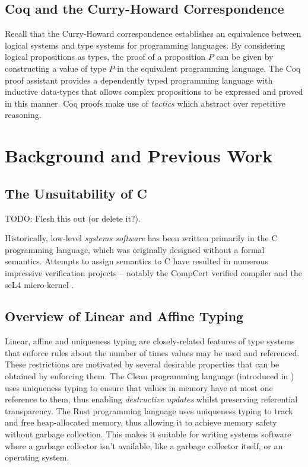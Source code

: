 \documentclass[]{unswthesis}
\let\i\textit
\begin{document}
\section{Coq and the Curry-Howard Correspondence}
\label{sec:curry_howard}

Recall that the Curry-Howard correspondence establishes an equivalence between logical systems and type systems for programming languages. By considering logical propositions as types, the proof of a proposition $P$ can be given by constructing a value of type $P$ in the equivalent programming language. The Coq proof assistant provides a dependently typed programming language with inductive data-types that allows complex propositions to be expressed and proved in this manner. Coq proofs make use of \i{tactics} which abstract over repetitive reasoning.

\chapter{Background and Previous Work}
\label{ch:background}

\section{The Unsuitability of C}

TODO: Flesh this out (or delete it?).

Historically, low-level \textit{systems software} has been written primarily in the C programming language, which was originally designed without a formal semantics. Attempts to assign semantics to C have resulted in numerous impressive verification projects -- notably the CompCert verified compiler \cite{leroy09} and the seL4 micro-kernel \cite{klein14}.

\section{Overview of Linear and Affine Typing}

Linear, affine and uniqueness typing are closely-related features of type systems that enforce rules about the number of times values may be used and referenced. These restrictions are motivated by several desirable properties that can be obtained by enforcing them. The Clean programming language (introduced in \cite{clean87}) uses uniqueness typing to ensure that values in memory have at most one reference to them, thus enabling \i{destructive updates} whilst preserving referential transparency. The Rust programming language \cite{rustWeb} uses uniqueness typing to track and free heap-allocated memory, thus allowing it to achieve memory safety without garbage collection. This makes it suitable for writing systems software where a garbage collector isn't available, like a garbage collector itself, or an operating system.
\end{document}
